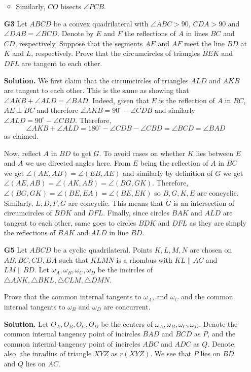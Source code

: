 \documentclass[11pt,a4paper]{article}
\begin{document}
\begin{enumerate}
\begin{itemize}
		\item Similarly, $CO$ bisects $\angle PCB$. 
	\end{itemize}

	\item [\textbf{G3}] Let $ABCD$ be a convex quadrilateral with $\angle ABC>90$, $CDA>90$ and $\angle DAB=\angle BCD$. Denote by $E$ and $F$ the reflections of $A$ in lines $BC$ and $CD$, respectively. Suppose that the segments $AE$ and $AF$ meet the line $BD$ at $K$ and $L$, respectively. Prove that the circumcircles of triangles $BEK$ and $DFL$ are tangent to each other.
	
	\textbf{Solution.} We first claim that the circumcircles of triangles $ALD$ and $AKB$ are tangent to each other. 
	This is the same as showing that $\angle AKB+\angle ALD=\angle BAD$. 
	Indeed, given that $E$ is the reflection of $A$ in $BC$, $AE\perp BC$ and therefore $\angle AKB=90^{\circ}-\angle CDB$ and similarly $\angle ALD=90^{\circ}-\angle CBD$. Therefore, 
	\[
	\angle AKB+\angle ALD=180^{\circ}-\angle CDB-\angle CBD=\angle BCD=\angle BAD
	\]
	as claimed. 
	
	Now, reflect $A$ in $BD$ to get $G$. To avoid cases on whether $K$ lies between $E$ and $A$ we use directed angles here. From $E$ being the reflection of $A$ in $BC$ we get $\angle (AE, AB)=\angle(EB, AE)$ and similarly by definition of $G$ we get $\angle (AE, AB)=\angle(AK, AB)=\angle(BG, GK)$. 
	Therefore, $\angle(BG, GK)=\angle(BE, EA)=\angle(BE, EK)$ so $B, G, K, E$ are concyclic. Similarly, $L, D, F, G$ are concyclic. This means that $G$ is an intersection of circumcircles of $BDK$ and $DFL$. Finally, since circles $BAK$ and $ALD$ are tangent to each other, same goes to circles $BDK$ and $DFL$ as they are simply the reflections of $BAK$ and $ALD$ in line $BD$. 
	
	\item [\textbf{G5}] 
	Let $ABCD$ be a cyclic quadrilateral. 
	Points $K, L, M, N$ are chosen on $AB, BC, CD, DA$ such that $KLMN$ is a rhombus with $KL \parallel AC$ and $LM \parallel BD$. 
	Let $\omega_A, \omega_B, \omega_C, \omega_D$ be the incircles of $\triangle ANK, \triangle BKL, \triangle CLM, \triangle DMN$.
	
	Prove that the common internal tangents to $\omega_A$, and $\omega_C$ and the common internal tangents to $\omega_B$ and $\omega_D$ are concurrent.
	
	\textbf{Solution.} 
	Let $O_A, O_B, O_C, O_D$ be the centers of $\omega_A, \omega_B, \omega_C, \omega_D$. 
	Denote the common internal tangency point of incircles $BAD$ and $BCD$ as $P$, 
	and the common internal tangency point of incircles $ABC$ and $ADC$ as $Q$. 
	Denote, also, the inradius of triangle $XYZ$ as $r(XYZ)$. 
	We see that $P$ lies on $BD$ and $Q$ lies on $AC$. 
	

\end{enumerate}
\end{document}
